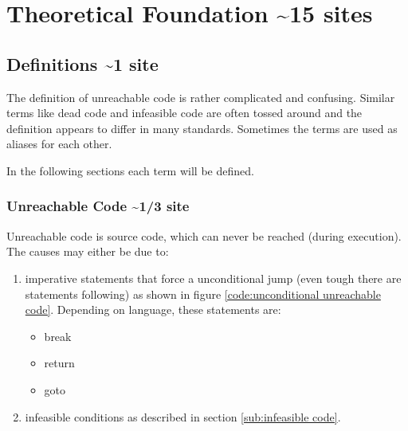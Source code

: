 
\chapter {Theoretical Foundation \textasciitilde 15 sites}
\label {cha:theoretical foundation}

\section{Definitions \textasciitilde 1 site}
\label{sec:definitions}

The definition of unreachable code is rather complicated and confusing. 
Similar terms like dead code and infeasible code are often tossed around and the definition appears to differ in many standards. 
Sometimes the terms are used as aliases for each other.


In the following sections each term will be defined.

\subsection{Unreachable Code \textasciitilde 1/3 site}
\label{sub:unreachable code}
Unreachable code is source code, which can never be reached (during execution). 
The causes may either be due to:
\begin{enumerate}
	\item imperative statements that force a unconditional jump (even tough there are statements following) as shown in figure \ref{code:unconditional unreachable code}. Depending on language, these statements are: 
	\begin{itemize}
		\item break
		\item return
		\item goto
	\end{itemize}
	\item infeasible conditions as described in section \ref{sub:infeasible code}. 
\end{enumerate}


